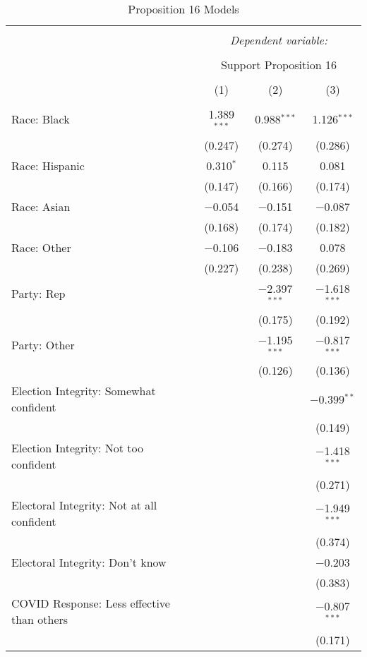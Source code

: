 
\begin{table}[!htbp] \centering 
  \caption{Proposition 16 Models} 
  \label{tab:reg_prop16_short} 
\footnotesize 
\begin{tabular}{@{\extracolsep{5pt}}lccc} 
\\[-1.8ex]\hline 
\hline \\[-1.8ex] 
 & \multicolumn{3}{c}{\textit{Dependent variable:}} \\ 
\cline{2-4} 
\\[-1.8ex] & \multicolumn{3}{c}{Support Proposition 16} \\ 
\\[-1.8ex] & (1) & (2) & (3)\\ 
\hline \\[-1.8ex] 
 Race: Black & 1.389$^{***}$ & 0.988$^{***}$ & 1.126$^{***}$ \\ 
  & (0.247) & (0.274) & (0.286) \\ 
  Race: Hispanic & 0.310$^{*}$ & 0.115 & 0.081 \\ 
  & (0.147) & (0.166) & (0.174) \\ 
  Race: Asian & $-$0.054 & $-$0.151 & $-$0.087 \\ 
  & (0.168) & (0.174) & (0.182) \\ 
  Race: Other & $-$0.106 & $-$0.183 & 0.078 \\ 
  & (0.227) & (0.238) & (0.269) \\ 
  Party: Rep &  & $-$2.397$^{***}$ & $-$1.618$^{***}$ \\ 
  &  & (0.175) & (0.192) \\ 
  Party: Other &  & $-$1.195$^{***}$ & $-$0.817$^{***}$ \\ 
  &  & (0.126) & (0.136) \\ 
  Election Integrity: Somewhat confident &  &  & $-$0.399$^{**}$ \\ 
  &  &  & (0.149) \\ 
  Election Integrity: Not too confident &  &  & $-$1.418$^{***}$ \\ 
  &  &  & (0.271) \\ 
  Electoral Integrity: Not at all confident &  &  & $-$1.949$^{***}$ \\ 
  &  &  & (0.374) \\ 
  Electoral Integrity: Don't know &  &  & $-$0.203 \\ 
  &  &  & (0.383) \\ 
  COVID Response: Less effective than others &  &  & $-$0.807$^{***}$ \\ 
  &  &  & (0.171) \\ 

\end{tabular}
\end{table}
